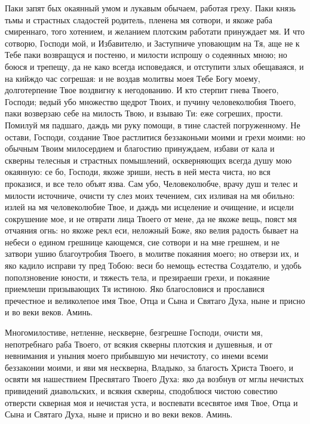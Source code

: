 \begin{mymulticols}

Паки запят бых окаянный умом и лукавым обычаем, работая греху. Паки князь тьмы и страстных сладостей родитель, пленена мя сотвори, и якоже раба смиреннаго, того хотением, и желанием плотским работати принуждает мя. И что сотворю, Господи мой, и Избавителю, и Заступниче уповающим на Тя, аще не к Тебе паки возвращуся и постеню, и милости испрошу о содеянных мною; но боюся и трепещу, да не како всегда исповедаяся, и отступити злых обещаваяся, и на кийждо час согрешая: и не воздав молитвы моея Тебе Богу моему, долготерпение Твое воздвигну к негодованию. И кто стерпит гнева Твоего, Господи; ведый убо множество щедрот Твоих, и пучину человеколюбия Твоего, паки возверзаю себе на милость Твою, и взываю Ти: еже согреших, прости. Помилуй мя падшаго, даждь ми руку помощи, в тине сластей погруженному. Не остави, Господи, создание Твое растлитися беззаконьми моими и грехи моими: но обычным Твоим милосердием и благостию принуждаем, избави от кала и скверны телесныя и страстных помышлений, оскверняющих всегда душу мою окаянную: се бо, Господи, якоже зриши, несть в ней места чиста, но вся проказися, и все тело объят язва. Сам убо, Человеколюбче, врачу душ и телес и милости источниче, очисти ту слез моих течением, сих изливая на мя обильно: излей на мя человеколюбие Твое, и даждь ми исцеление и очищение, и исцели сокрушение мое, и не отврати лица Твоего от мене, да не якоже вещь, пояст мя отчаяния огнь: но якоже рекл еси, неложный Боже, яко велия радость бывает на небеси о едином грешнице кающемся, сие сотвори и на мне грешнем, и не затвори ушию благоутробия Твоего, в молитве покаяния моего; но отверзи их, и яко кадило исправи ту пред Тобою: веси бо немощь естества Создателю, и удобь поползновение юности, и тяжесть тела, и презираеши грехи, и покаяние приемлеши призывающих Тя истиною. Яко благословися и прославися пречестное и великолепое имя Твое, Отца и Сына и Святаго Духа, ныне и присно и во веки веков. Аминь.




Многомилостиве, нетленне, нескверне, безгрешне Господи, очисти мя, непотребнаго раба Твоего, от всякия скверны плотския и душевныя, и от невнимания и уныния моего прибывшую ми нечистоту, со инеми всеми беззаконии моими, и яви мя нескверна, Владыко, за благость Христа Твоего, и освяти мя нашествием Пресвятаго Твоего Духа: яко да возбнув от мглы нечистых привидений диавольских, и всякия скверны, сподоблюся чистою совестию отверсти скверная моя и нечистая уста, и воспевати всесвятое имя Твое, Отца и Сына и Святаго Духа, ныне и присно и во веки веков. Аминь.



\end{mymulticols}

